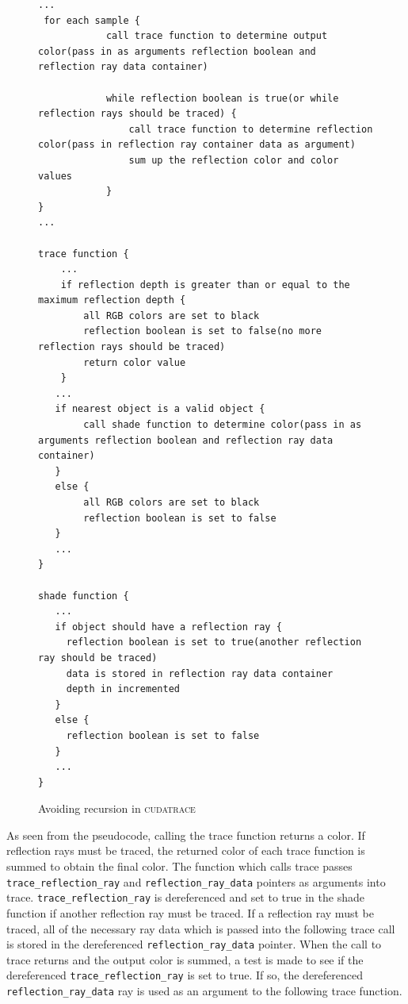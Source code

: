 \documentclass[12pt]{article}
\begin{document}
\begin{figure}
    \caption{Avoiding recursion in \textsc{cudatrace}} \label{code:recursion_workaround}
\begin{lstlisting}
...
 for each sample {      
            call trace function to determine output color(pass in as arguments reflection boolean and reflection ray data container)

            while reflection boolean is true(or while reflection rays should be traced) {
                call trace function to determine reflection color(pass in reflection ray container data as argument)
                sum up the reflection color and color values
            }
}
...

trace function {
    ...  
    if reflection depth is greater than or equal to the maximum reflection depth {
        all RGB colors are set to black
        reflection boolean is set to false(no more reflection rays should be traced)
        return color value
    }
   ...
   if nearest object is a valid object {
        call shade function to determine color(pass in as arguments reflection boolean and reflection ray data container)
   } 
   else {
        all RGB colors are set to black
        reflection boolean is set to false
   }
   ...
}

shade function {
   ...
   if object should have a reflection ray {
     reflection boolean is set to true(another reflection ray should be traced)
     data is stored in reflection ray data container
     depth in incremented
   }   
   else {
     reflection boolean is set to false
   }
   ...
}  
\end{lstlisting}
\end{figure}

As seen from the pseudocode, calling the trace function returns a color. If reflection rays must be traced, the returned color of each trace function is summed to obtain the final color. The function which calls trace passes \texttt{trace\_reflection\_ray} and \texttt{reflection\_ray\_data} pointers as arguments into trace. \texttt{trace\_reflection\_ray} is dereferenced and set to true in the shade function if another reflection ray must be traced. If a reflection ray must be traced, all of the necessary ray data which is passed into the following trace call is stored in the dereferenced \texttt{reflection\_ray\_data} pointer. When the call to trace returns and the output color is summed, a test is made to see if the dereferenced \texttt{trace\_reflection\_ray} is set to true. If so, the dereferenced \texttt{reflection\_ray\_data} ray is used as an argument to the following trace function.
\end{document}
